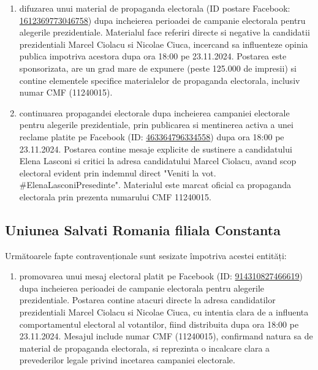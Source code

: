 \documentclass[a4paper,12pt]{article}
\begin{document}
\begin{enumerate}[leftmargin=*, label=\arabic*.)]
    \item difuzarea unui material de propaganda electorala (ID postare Facebook: \href{https://www.facebook.com/ads/library/?id=1612369773046758}{1612369773046758}) dupa incheierea perioadei de campanie electorala pentru alegerile prezidentiale. Materialul face referiri directe si negative la candidatii prezidentiali Marcel Ciolacu si Nicolae Ciuca, incercand sa influenteze opinia publica impotriva acestora dupa ora 18:00 pe 23.11.2024. Postarea este sponsorizata, are un grad mare de expunere (peste 125.000 de impresii) si contine elementele specifice materialelor de propaganda electorala, inclusiv numar CMF (11240015).
    \item continuarea propagandei electorale dupa incheierea campaniei electorale pentru alegerile prezidentiale, prin publicarea si mentinerea activa a unei reclame platite pe Facebook (ID: \href{https://www.facebook.com/ads/library/?id=463364796334558}{463364796334558}) dupa ora 18:00 pe 23.11.2024. Postarea contine mesaje explicite de sustinere a candidatului Elena Lasconi si critici la adresa candidatului Marcel Ciolacu, avand scop electoral evident prin indemnul direct "Veniti la vot. \#ElenaLasconiPresedinte". Materialul este marcat oficial ca propaganda electorala prin prezenta numarului CMF 11240015.
\end{enumerate}

\vspace{0.5cm}

\subsection{Uniunea Salvati Romania filiala Constanta}
Următoarele fapte contravenționale sunt sesizate împotriva acestei entități:

\begin{enumerate}[leftmargin=*, label=\arabic*.)]
    \item promovarea unui mesaj electoral platit pe Facebook (ID: \href{https://www.facebook.com/ads/library/?id=914310827466619}{914310827466619}) dupa incheierea perioadei de campanie electorala pentru alegerile prezidentiale. Postarea contine atacuri directe la adresa candidatilor prezidentiali Marcel Ciolacu si Nicolae Ciuca, cu intentia clara de a influenta comportamentul electoral al votantilor, fiind distribuita dupa ora 18:00 pe 23.11.2024. Mesajul include numar CMF (11240015), confirmand natura sa de material de propaganda electorala, si reprezinta o incalcare clara a prevederilor legale privind incetarea campaniei electorale.
\end{enumerate}
\end{document}

